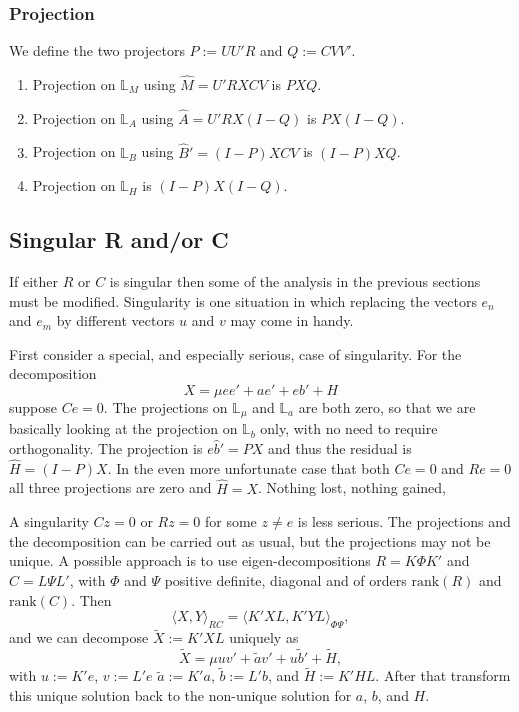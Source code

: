 \documentclass[
  12pt,
  letterpaper,
  DIV=11,
  numbers=noendperiod]{scrartcl}
\providecommand{\tightlist}{%
  \setlength{\itemsep}{0pt}\setlength{\parskip}{0pt}}
\begin{document}
\subsubsection{Projection}\label{projection-1}

We define the two projectors \(P:=UU'R\) and \(Q:=CVV'\).

\begin{enumerate}
\def\labelenumi{\arabic{enumi}.}
\tightlist
\item
  Projection on \(\mathbb{L}_M\) using \(\hat M=U'RXCV\) is \(PXQ\).
\item
  Projection on \(\mathbb{L}_A\) using \(\hat A=U'RX(I-Q)\) is
  \(PX(I-Q)\).
\item
  Projection on \(\mathbb{L}_B\) using \(\hat B'=(I-P)XCV\) is
  \((I-P)XQ\).
\item
  Projection on \(\mathbb{L}_H\) is \((I-P)X(I-Q)\).
\end{enumerate}

\subsection{Singular R and/or C}\label{singular-r-andor-c}

If either \(R\) or \(C\) is singular then some of the analysis in the
previous sections must be modified. Singularity is one situation in
which replacing the vectors \(e_n\) and \(e_m\) by different vectors
\(u\) and \(v\) may come in handy.

First consider a special, and especially serious, case of singularity.
For the decomposition \begin{equation}
X=\mu ee'+ae'+eb'+H
\end{equation} suppose \(Ce=0\). The projections on \(\mathbb{L}_\mu\)
and \(\mathbb{L}_a\) are both zero, so that we are basically looking at
the projection on \(\mathbb{L}_b\) only, with no need to require
orthogonality. The projection is \(e\hat b'=PX\) and thus the residual
is \(\hat H=(I-P)X\). In the even more unfortunate case that both
\(Ce=0\) and \(Re=0\) all three projections are zero and \(\hat H=X\).
Nothing lost, nothing gained,

A singularity \(Cz=0\) or \(Rz=0\) for some \(z\neq e\) is less serious.
The projections and the decomposition can be carried out as usual, but
the projections may not be unique. A possible approach is to use
eigen-decompositions \(R=K\Phi K'\) and \(C=L\Psi L'\), with \(\Phi\)
and \(\Psi\) positive definite, diagonal and of orders
\(\text{rank}(R)\) and \(\text{rank}(C)\). Then \begin{equation}
\langle X,Y\rangle_{RC}=\langle K'XL,K'YL\rangle_{\Phi\Psi},
\end{equation} and we can decompose \(\tilde X:=K'XL\) uniquely as
\begin{equation}
\tilde X=\mu uv'+\tilde av'+u\tilde b'+\tilde H,
\end{equation} with \(u:=K'e\), \(v:=L'e\) \(\tilde a:=K'a\),
\(\tilde b:=L'b\), and \(\tilde H:=K'HL\). After that transform this
unique solution back to the non-unique solution for \(a\), \(b\), and
\(H\).
\end{document}
